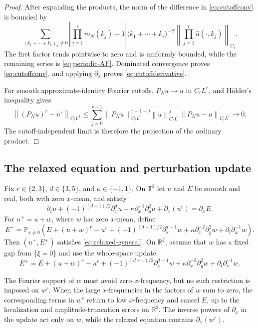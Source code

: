 \documentclass[12pt,reqno,letterpaper]{amsart}
\numberwithin{equation}{section}
\theoremstyle{definition}
\newcommand{\T}{\mathbb T}
\newcommand{\R}{\mathbb R}
\newcommand{\norm}[1]{\left\lVert #1\right\rVert}
\newcommand{\abs}[1]{\left\lvert #1\right\rvert}
\begin{document}
\begin{proof}
After expanding the products, the norm of the difference in
\eqref{eq:cutoffconv} is bounded by
\[
 \sum_{(k_1+\cdots+k_r)_x\neq0}
 \abs{\prod_{j=1}^rm_N(k_j)-1}
 \langle k_1+\cdots+k_r\rangle^{-S}
 \norm{\prod_{j=1}^r\widehat u(\cdot,k_j)}_{C_t}.
\]
The first factor tends pointwise to zero and is uniformly bounded, while
the remaining series is \eqref{eq:periodic-AF}.  Dominated convergence
proves \eqref{eq:cutoffconv}, and applying $\partial_x$ proves
\eqref{eq:cutoffderivative}.

For smooth approximate-identity Fourier cutoffs,
$P_Nu\to u$ in $C_tL^r$, and H\"older's inequality gives
\[
 \norm{(P_Nu)^r-u^r}_{C_tL^1}
 \leq\sum_{j=0}^{r-1}
  \norm{P_Nu}_{C_tL^r}^{r-1-j}\norm u_{C_tL^r}^j
  \norm{P_Nu-u}_{C_tL^r}\longrightarrow0.
\]
The cutoff-independent limit is therefore the projection of the ordinary
product.
\end{proof}

\subsection{The relaxed equation and perturbation update}

Fix $r\in\{2,3\}$, $d\in\{3,5\}$, and
$\kappa\in\{-1,1\}$.  On $\T^2$ let $u$ and $E$ be smooth and real,
both with zero $x$-mean, and satisfy
\begin{equation}\label{eq:relaxed-general}
 \partial_tu+(-1)^{(d+1)/2}\partial_x^du
 +\kappa\partial_x^{-1}\partial_y^2u+\partial_x(u^r)
 =\partial_xE.
\end{equation}
For $u^+=u+w$, where $w$ has zero $x$-mean, define
\begin{equation}\label{eq:periodic-update-general}
 E^+=\mathbb P_{x\neq0}\left(
 E+(u+w)^r-u^r+(-1)^{(d+1)/2}\partial_x^{d-1}w
 +\kappa\partial_x^{-2}\partial_y^2w
 +\partial_t\partial_x^{-1}w\right).
\end{equation}
Then $(u^+,E^+)$ satisfies \eqref{eq:relaxed-general}.  On $\R^2$, assume
that $\widehat w$ has a fixed gap from $\{\xi=0\}$ and use the whole-space
update
\begin{equation}\label{eq:Euclidean-update-general}
 E^+=E+(u+w)^r-u^r+(-1)^{(d+1)/2}\partial_x^{d-1}w
 +\kappa\partial_x^{-2}\partial_y^2w
 +\partial_t\partial_x^{-1}w.
\end{equation}

The Fourier support of $w$ must avoid zero $x$-frequency, but no such
restriction is imposed on $w^r$.  When the large $x$-frequencies in the
factors of $w$ sum to zero, the corresponding terms in $w^r$ return to
low $x$-frequency and cancel $E$, up to the localization and
amplitude-truncation errors on $\R^2$.  The inverse powers of
$\partial_x$ in the update act only on $w$, while the relaxed equation
contains $\partial_x(w^r)$.
\end{document}
